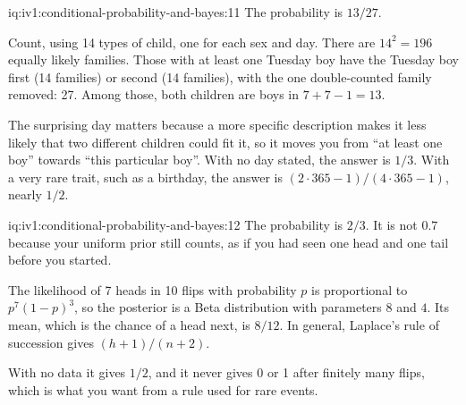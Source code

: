 \begin{solution}{iq:iv1:conditional-probability-and-bayes:11}
The probability is $13/27$.

Count, using 14 types of child, one for each sex and day. There are $14^2 = 196$ equally likely families. Those with at least one Tuesday boy have the Tuesday boy first (14 families) or second (14 families), with the one double-counted family removed: 27. Among those, both children are boys in $7 + 7 - 1 = 13$.

The surprising day matters because a more specific description makes it less likely that two different children could fit it, so it moves you from ``at least one boy'' towards ``this particular boy''. With no day stated, the answer is $1/3$. With a very rare trait, such as a birthday, the answer is $(2 \cdot 365 - 1)/(4 \cdot 365 - 1)$, nearly $1/2$.

\end{solution}

\begin{solution}{iq:iv1:conditional-probability-and-bayes:12}
The probability is $2/3$. It is not $0.7$ because your uniform prior still counts, as if you had seen one head and one tail before you started.

The likelihood of 7 heads in 10 flips with probability $p$ is proportional to $p^7(1 - p)^3$, so the posterior is a Beta distribution with parameters $8$ and $4$. Its mean, which is the chance of a head next, is $8/12$. In general, Laplace's rule of succession gives $(h + 1)/(n + 2)$.

With no data it gives $1/2$, and it never gives 0 or 1 after finitely many flips, which is what you want from a rule used for rare events.

\end{solution}

